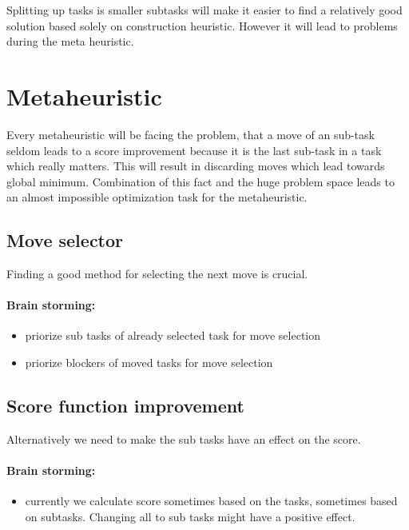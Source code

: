 \documentclass[10pt,a4paper]{article}
\begin{document}
Splitting up tasks is smaller subtasks will make it easier to find a relatively good solution based solely on construction heuristic. However it will lead to problems during the meta heuristic.

\section{Metaheuristic}

Every metaheuristic will be facing the problem, that a move of an sub-task seldom leads to a score improvement because it is the last sub-task in a task which really matters. This will result in discarding moves which lead towards global minimum. Combination of this fact and the huge problem space leads to an almost impossible optimization task for the metaheuristic.

\subsection{Move selector}
Finding a good method for selecting the next move is crucial.

\paragraph{Brain storming:}
\begin{itemize}
\item priorize sub tasks of already selected task for move selection
\item priorize blockers of moved tasks for move selection
\end{itemize}

\subsection{Score function improvement}

Alternatively we need to make the sub tasks have an effect on the score.

\paragraph{Brain storming:}
\begin{itemize}
\item currently we calculate score sometimes based on the tasks, sometimes based on subtasks. Changing all to sub tasks might have a positive effect.
\end{itemize}
\end{document}
